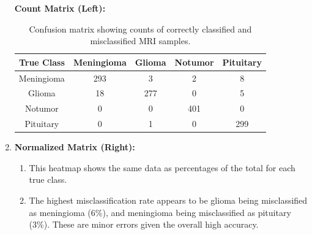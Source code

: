 \begin{enumerate}[label=\roman*.]
\textbf{Count Matrix (Left):} 
\begin{table}[h!]
\centering
\caption{Confusion matrix showing counts of correctly classified and misclassified MRI samples.}

\begin{tabular}{ccccc}
\toprule
\textbf{True Class} & \textbf{Meningioma} & \textbf{Glioma} & \textbf{Notumor} & \textbf{Pituitary} \\
\midrule
Meningioma & 293 & 3 & 2 & 8 \\
Glioma     & 18  & 277 & 0 & 5 \\
Notumor    & 0   & 0 & 401 & 0 \\
Pituitary  & 0   & 1 & 0 & 299 \\
\bottomrule
\end{tabular}
\end{table} 

\item \textbf{Normalized Matrix (Right):}  
\begin{enumerate}[label=$\bullet$]

\item This heatmap shows the same data as percentages of the total for each true class. 

\item The highest misclassification rate appears to be glioma being misclassified as meningioma (6\%), and meningioma being misclassified as pituitary (3\%). These are minor errors given the overall high accuracy.
\end{enumerate}
\end{enumerate}




